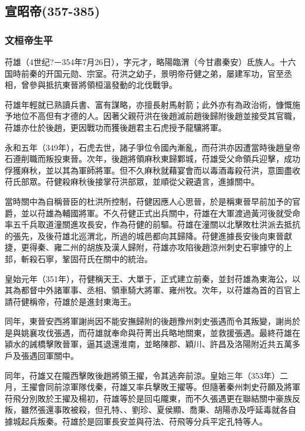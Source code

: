 
\subsection{宣昭帝\tiny(357-385)}

\subsubsection{文桓帝生平}

苻雄（4世纪?－354年7月26日），字元才，略陽臨渭（今甘肅秦安）氐族人。十六国時前秦的开国元勋、宗室。苻洪之幼子，景明帝苻健之弟，屡建军功，官至丞相，曾參與抵抗東晉將領桓溫發動的北伐戰爭。

苻雄年輕就已熟讀兵書、富有謀略，亦擅長射馬射箭；此外亦有為政治術，慷慨施予地位不高但有才德的人。因著父親苻洪在後趙滅前趙後歸附後趙並接受其官職，苻雄亦仕於後趙，更因戰功而獲後趙君主石虎授予龍驤將軍。

永和五年（349年），石虎去世，諸子爭位令國內漸亂，而苻洪亦因遭當時後趙皇帝石遵削職而叛投東晉。次年，後趙將領麻秋東歸鄴城，苻雄受父命領兵迎擊，成功俘獲麻秋，並以其為軍師將軍。但不久麻秋就藉宴會而以毒酒毒殺苻洪，意圖盡收苻氏部眾。苻健殺麻秋後接掌苻洪部眾，並順從父親遺言，進據關中。

當時關中為自稱晉臣的杜洪所控制，苻健因應人心思晉，於是稱東晉早前加予的官爵，並以苻雄為輔國將軍。不久苻健正式出兵關中，苻雄在大軍渡過黃河後就受命率五千兵取道潼關進攻長安，作為苻健的前驅。苻雄在潼關以北擊敗杜洪派去抵抗的張先，及後苻雄北巡渭北，所過的城邑都向其歸降。苻健進據長安後向東晉獻捷，更得秦、雍二州的胡族及漢人歸附，苻雄亦攻陷後趙涼州刺史石寧據守的上邽，斬殺石寧，鞏固苻氏在關中的統治。

皇始元年（351年），苻健稱天王、大單于，正式建立前秦，並封苻雄為東海公，以其為都督中外諸軍事、丞相、領車騎大將軍、雍州牧。次年，以苻雄為首的百官上請苻健稱帝，苻雄於是進封東海王。

同年，東晉安西將軍謝尚因不能安撫歸附的後趙豫州刺史張遇而令其叛變，謝尚於是與姚襄攻伐張遇，而苻雄就奉命與苻菁出兵略地關東，並救援張遇。最終苻雄在潁水的誡橋擊敗晉軍，逼其退還淮南，並略陳郡、穎川、許昌及洛陽附近共五萬多戶及張遇回軍關中。

同年，苻雄又在隴西擊敗後趙將領王擢，令其逃奔前涼。皇始三年（353年）二月，王擢會同前涼軍隊伐秦，苻雄又率兵擊敗王擢等。但隨著秦州刺史苻願及將軍苻飛分別敗於王擢及楊初，苻雄等於是回屯隴東，而不久張遇更在聯結關中豪族反叛，雖然張還事敗被殺，但孔特、、劉珍、夏侯顯、喬秉、胡陽赤及呼延毒就各自據城起兵叛秦。苻雄於是回軍長安並與苻法、苻飛等分兵平定孔特等人。

